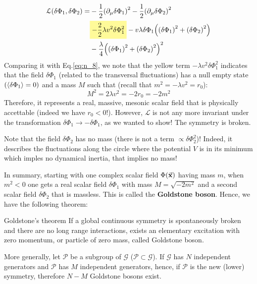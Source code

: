 \documentclass[../../Main/Main.tex]{subfiles}
\begin{document}
\begin{equation}
\begin{split}
\mathcal{L} \qty(\delta \Phi _1, \delta \Phi _2)   = &  - \frac{1}{2} \qty(\partial_ \mu  \delta \Phi _1 )^2 - \frac{1}{2} \qty(\partial_ \mu \delta \Phi _2 )^2   \\
& \mathcolorbox{yellow!40}{- \frac{2}{2} \lambda v^2 \delta \Phi _1^2} - v \lambda \delta \Phi _1 \qty( \qty(\delta \Phi _1)^2 + \qty(\delta \Phi _2 )^2  ) \\
& - \frac{\lambda }{4} \qty( \qty(\delta \Phi _1)^2 + \qty(\delta \Phi _2)^2  )^2
\end{split}
\end{equation}
Comparing it with Eq.\eqref{eq:n_8}, we note that the yellow term \( - \lambda v^2 \delta \Phi _1^2 \) indicates that the field \( \delta \Phi _1 \) (related to the transversal fluctuations) has a null empty state \( ( \expval{\delta \Phi _1}= 0 ) \) and a mass \( M \) such that (recall that \( m^2 = - \lambda v^2 = r_0 \)):
\begin{equation*}
  M^2 = 2 \lambda v^2 =  -2 r_0 = - 2m^2
\end{equation*}
Therefore, it represents a real, massive, mesonic scalar field that is physically accettable (indeed we have \( r_0<0 \)!).
However, \( \mathcal{L} \) is not any more invariant under the transformation \( \delta \Phi _1 \rightarrow - \delta \Phi _1 \), as we wanted to show! The symmetry is broken.


\begin{remark}
  Note that the field \( \delta \Phi _2 \) has no mass (there is not a term \( \propto \delta \Phi _2^2 \))! Indeed, it describes the fluctuations along the circle where the potential \( V \) is in its minimum  which imples no dynamical inertia, that implies no mass!
\end{remark}

In summary, starting with one complex scalar field \( \Phi (\va{x}) \) having mass \( m \), when \( m^2 < 0 \) one gets a real scalar field \( \delta \Phi _1 \) with mass \( M = \sqrt{- 2 m^2}  \)  and a second scalar field \( \delta \Phi _2 \) that is massless. This is called the \textbf{Goldstone boson}. Hence, we have the following theorem:

\begin{theorem}{Goldstone's theorem}{}
If a global continuous symmetry is spontaneously broken and there are no long range interactions, exists an elementary excitation with zero momentum, or particle of zero mass, called Goldstone boson.

More generally, let \( \mathcal{P} \) be a subgroup of \( \mathcal{G} \) (\( \mathcal{P} \subset \mathcal{G} \)). If \( \mathcal{G} \) has \( N \) independent generators and \( \mathcal{P} \)  has \( M \) independent generators, hence, if \( \mathcal{P} \) is the new (lower) symmetry, therefore \( N-M \)  Goldstone bosons exist.
\end{theorem}
\end{document}
